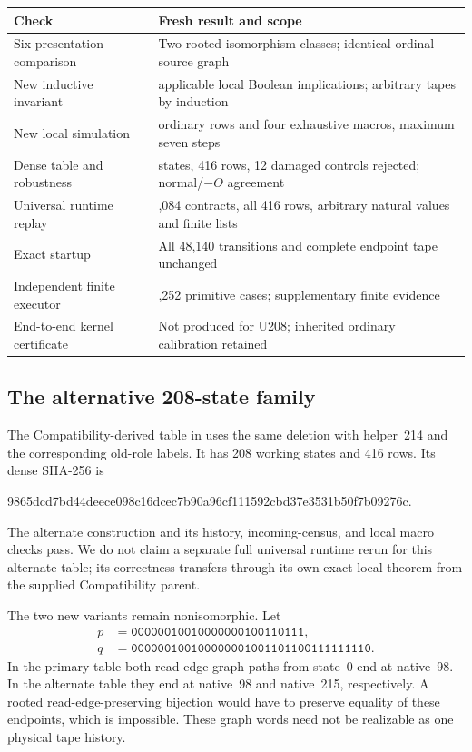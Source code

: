 \begin{center}
\small
\begin{tabular}{@{}>{\raggedright\arraybackslash}p{64mm}>{\raggedright\arraybackslash}p{84mm}@{}}
\toprule
Check & Fresh result and scope\\
\midrule
Six-presentation comparison & Two rooted isomorphism classes; identical ordinal source graph\\
New inductive invariant & 104 applicable local Boolean implications; arbitrary tapes by induction\\
New local simulation & 414 ordinary rows and four exhaustive macros, maximum seven steps\\
Dense table and robustness & 208 states, 416 rows, 12 damaged controls rejected; normal/$-O$ agreement\\
Universal runtime replay & 5,084 contracts, all 416 rows, arbitrary natural values and finite lists\\
Exact startup & All 48,140 transitions and complete endpoint tape unchanged\\
Independent finite executor & 15,252 primitive cases; supplementary finite evidence\\
End-to-end kernel certificate & Not produced for U208; inherited ordinary calibration retained\\
\bottomrule
\end{tabular}
\end{center}

\subsection{The alternative 208-state family}
The Compatibility-derived table in  uses the
same deletion with helper~214 and the corresponding old-role labels.
It has 208 working states and 416 rows. Its dense SHA-256 is
\begin{center}\small\ttfamily
9865dcd7bd44deece098c16dcec7b90a96cf111592cbd37e3531b50f7b09276c.
\end{center}
The alternate construction and its history, incoming-census, and local
macro checks pass. We do not claim a separate full universal runtime
rerun for this alternate table; its correctness transfers through its
own exact local theorem from the supplied Compatibility parent.

The two new variants remain nonisomorphic. Let
\[
\begin{split}
p&=\texttt{00000010010000000100110111},\\
q&=\texttt{000000100100000001001101100111111110}.
\end{split}
\]
In the primary table both read-edge graph paths from state~0 end at
native~98. In the alternate table they end at native~98 and native~215,
respectively. A rooted read-edge-preserving bijection would have to
preserve equality of these endpoints, which is impossible. These graph
words need not be realizable as one physical tape history.
